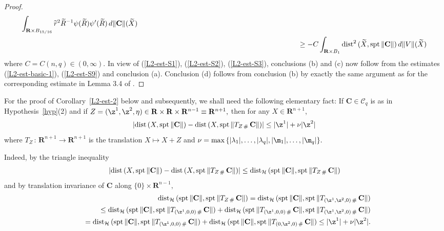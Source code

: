\documentclass[a4paper,11pt]{amsart}
\begin{document}
\begin{proof}
\begin{eqnarray}
\int_{{\mathbf R} \times B_{15/16}}\widetilde{r}^{2}\widetilde{R}^{-1}\psi(\widetilde{R})\psi^{\prime}(\widetilde{R}) \, d\|{\mathbf C}\|(\widetilde{X})\nonumber\\ 
&&\hspace{3in}\geq -C\int_{{\mathbf R} \times B_{1}}{\rm dist}^{2} \, (\widetilde{X}, {\rm spt} \, \|{\mathbf C}\|) \, d\|V\|(\widetilde{X})
\end{eqnarray}
where $C = C(n, q) \in (0, \infty)$. In view of (\ref{L2-est-S1}), (\ref{L2-est-S2}), (\ref{L2-est-S3}), conclusions (b) and (c) now follow from the estimates (\ref{L2-est-basic-1}), (\ref{L2-est-S9}) and  conclusion (a).  Conclusion (d) follows from conclusion (b) by exactly the same argument as for the corresponding estimate in Lemma 3.4 of \cite{S}.
\end{proof}

For the proof of Corollary~\ref{L2-est-2}  below and subsequently,  we shall need the following elementary fact: If ${\mathbf C} \in {\mathcal C}_{q}$ is as in Hypothesis~\ref{hyp}(2) and if
$Z = (\z^{1}, \z^{2}, \eta) \in {\mathbf R} \times {\mathbf R} \times {\mathbf R}^{n-1} \equiv {\mathbf R}^{n+1},$ then for any $X \in {\mathbf R}^{n+1}$,
\begin{equation}\label{cone-dist}
\left|{\rm dist} \, (X, {\rm spt} \, \|{\mathbf C}\|) - {\rm dist} \, (X, {\rm spt} \, \|T_{Z \, \#} \, {\mathbf C}\|)\right| \leq |\z^{1}| + \nu|\z^{2}|
\end{equation}
where $T_{Z} \, : \, {\mathbf R}^{n+1} \to {\mathbf R}^{n+1}$ is the translation $X \mapsto X + Z$ and 
$\nu  = {\rm max} \, \{|\lambda_{1}|, \ldots, |\lambda_{q}|, |\m_{1}|, \ldots, |\m_{q}|\}.$

Indeed, by the triangle inequality 
$$\left|{\rm dist} \, (X, {\rm spt} \, \|{\mathbf C}\|) - {\rm dist} \, (X, {\rm spt} \, \|T_{Z \, \#} \, {\mathbf C}\|)\right| \leq {\rm dist}_{\mathcal H} \, ({\rm spt} \, \|{\mathbf C}\|, {\rm spt} \, \|T_{Z \, \#} \, {\mathbf C}\|)$$ 
and by translation invariance of ${\mathbf C}$ along $\{0\} \times {\mathbf R}^{n-1},$
\begin{eqnarray*}
&&\hspace{-.5in}{\rm dist}_{\mathcal H} \, ({\rm spt} \, \|{\mathbf C}\|, {\rm spt} \, \|T_{Z \, \#} \, {\mathbf C}\|)
 = {\rm dist}_{\mathcal H} \, ({\rm spt} \, \|{\mathbf C}\|, {\rm spt} \, \|T_{(\z^{1}, \z^{2}, 0) \, \#} \, {\mathbf C}\|)\nonumber\\
&& \leq {\rm dist}_{\mathcal H} \, ({\rm spt} \, \|{\mathbf C}\|, {\rm spt} \, \|T_{(\z^{1}, 0, 0) \, \#} \, {\mathbf C}\|) + {\rm dist}_{\mathcal H} \, ({\rm spt} \, \|T_{(\z^{1}, 0, 0) \, \#} \, {\mathbf C}\|, {\rm spt} \, \|T_{(\z^{1},\z^{2}, 0)\, \#} \, {\mathbf C}\|)\nonumber\\
&&={\rm dist}_{\mathcal H} \, ({\rm spt} \, \|{\mathbf C}\|, {\rm spt} \, \|T_{(\z^{1}, 0, 0) \, \#} \, {\mathbf C}\|) + {\rm dist}_{\mathcal H} \, ({\rm spt} \, \|{\mathbf C}\|, {\rm spt} \, \|T_{(0, \z^{2}, 0)\, \#} \, {\mathbf C}\|)\leq |\z^{1}| + \nu|\z^{2}|.\\
\end{eqnarray*}
\end{document}
